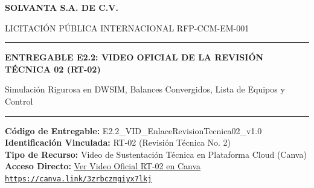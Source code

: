 \documentclass[11pt,letterpaper]{article}
\begin{document}
\begin{center}
    {\Huge\bfseries\color{solvantaBlue} SOLVANTA S.A. DE C.V.\par}
    \vspace{0.4cm}
    {\large\color{gray} LICITACI\'ON P\'UBLICA INTERNACIONAL RFP-CCM-EM-001\par}
    \vspace{0.8cm}
    \rule{\linewidth}{1.5pt}\par
    \vspace{0.8cm}
    {\LARGE\bfseries ENTREGABLE E2.2: VIDEO OFICIAL DE LA REVISI\'ON T\'ECNICA 02 (RT-02)\par}
    \vspace{0.3cm}
    {\large Simulaci\'on Rigurosa en DWSIM, Balances Convergidos, Lista de Equipos y Control\par}
    \vspace{0.8cm}
    \rule{\linewidth}{1.5pt}\par
    \vspace{1.3cm}

    \textbf{C\'odigo de Entregable:} E2.2\_VID\_EnlaceRevisionTecnica02\_v1.0\\
    \textbf{Identificaci\'on Vinculada:} RT-02 (Revisi\'on T\'ecnica No. 2)\\
    \textbf{Tipo de Recurso:} Video de Sustentaci\'on T\'ecnica en Plataforma Cloud (Canva)\\
    \vspace{0.4cm}
    \textbf{Acceso Directo:} \href{https://canva.link/3zrbczmgiyx7lkj}{\color{solvantaAccent}\underline{\Large Ver Video Oficial RT-02 en Canva}}\\
    \vspace{0.4cm}
    \texttt{\url{https://canva.link/3zrbczmgiyx7lkj}}
    \vspace{1.5cm}


\end{center}
\end{document}
